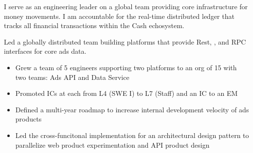 \documentclass[10pt,a4paper,ragged2e,withhyper]{altacv}
\begin{document}

\makecvheader{}



\begin{paracol}{2}



I serve as an engineering leader on a global team providing core infrastructure for money movements. I am
accountable for the real-time distributed ledger that tracks all financial transactions within the Cash echosystem.


\divider{}


Led a globally distributed team building platforms that provide Rest, , and RPC interfaces for core ads data.

\begin{itemize}
\item Grew a team of 5 engineers supporting two platforms to an org of 15 with two teams: Ads API and Data Service
\item Promoted ICs at each from L4 (SWE I) to L7 (Staff) and an IC to an EM
\item Defined a multi-year roadmap to increase internal development velocity of ads products
\item Led the cross-funcitonal implementation for an architectural design pattern to parallelize web product experimentation and API product design
\end{itemize}



\end{paracol}
\end{document}
